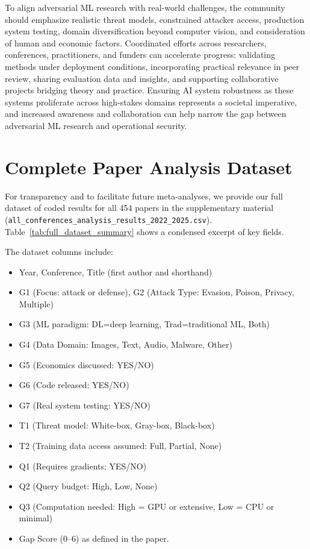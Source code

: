 \documentclass[11pt,a4paper]{article}
\begin{document}
To align adversarial ML research with real-world challenges, the community should emphasize realistic threat models, constrained attacker access, production system testing, domain diversification beyond computer vision, and consideration of human and economic factors. Coordinated efforts across researchers, conferences, practitioners, and funders can accelerate progress: validating methods under deployment conditions, incorporating practical relevance in peer review, sharing evaluation data and insights, and supporting collaborative projects bridging theory and practice. Ensuring AI system robustness as these systems proliferate across high-stakes domains represents a societal imperative, and increased awareness and collaboration can help narrow the gap between adversarial ML research and operational security.

\newpage



\newpage
\appendix
\section{Complete Paper Analysis Dataset}

For transparency and to facilitate future meta-analyses, we provide our full dataset of coded results for all 454 papers in the supplementary material (\texttt{all\_conferences\_analysis\_results\_2022\_2025.csv}). Table~\ref{tab:full_dataset_summary} shows a condensed excerpt of key fields.

The dataset columns include:
\begin{itemize}[noitemsep]
    \item Year, Conference, Title (first author and shorthand)
    \item G1 (Focus: attack or defense), G2 (Attack Type: Evasion, Poison, Privacy, Multiple)
    \item G3 (ML paradigm: DL=deep learning, Trad=traditional ML, Both)
    \item G4 (Data Domain: Images, Text, Audio, Malware, Other)
    \item G5 (Economics discussed: YES/NO)
    \item G6 (Code released: YES/NO)
    \item G7 (Real system testing: YES/NO)
    \item T1 (Threat model: White-box, Gray-box, Black-box)
    \item T2 (Training data access assumed: Full, Partial, None)
    \item Q1 (Requires gradients: YES/NO)
    \item Q2 (Query budget: High, Low, None)
    \item Q3 (Computation needed: High = GPU or extensive, Low = CPU or minimal)
    \item Gap Score (0--6) as defined in the paper.
\end{itemize}
\end{document}
